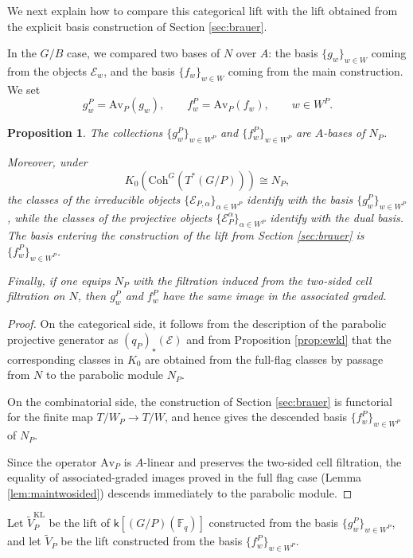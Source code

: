 \documentclass{amsart}
\newtheorem{prop}[thm]{Proposition}
\theoremstyle{definition}
\begin{document}
We next explain how to compare this categorical lift with the lift obtained from
the explicit basis construction of Section \ref{sec:brauer}.

In the $G/B$ case, we compared two bases of $N$ over $A$:
the basis $\{g_w\}_{w\in W}$ coming from the objects $\mathcal E_w$,
and the basis $\{f_w\}_{w\in W}$ coming from the main construction.
We set
\[
g_w^P = \mathrm{Av}_P(g_w), \qquad
f_w^P = \mathrm{Av}_P(f_w), \qquad w\in W^P.
\]

\begin{prop}\label{prop:parabolic-descent}
The collections $\{g_w^P\}_{w\in W^P}$ and $\{f_w^P\}_{w\in W^P}$
are $A$-bases of $N_P$.

Moreover, under
\[
K_0(\mathrm{Coh}^G(T^*(G/P)))\cong N_P,
\]
the classes of the irreducible objects
$\{\mathcal E_{P,\alpha}\}_{\alpha\in W^P}$ identify with the basis
$\{g_w^P\}_{w\in W^P}$, while the classes of the projective objects
$\{\mathcal E_P^{\alpha}\}_{\alpha\in W^P}$ identify with the dual basis. The basis entering the construction of the lift from
Section \ref{sec:brauer} is $\{f_w^P\}_{w\in W^P}$.

Finally, if one equips $N_P$ with the filtration induced from the two-sided
cell filtration on $N$, then $g_w^P$ and $f_w^P$ have the same image in the
associated graded.
\end{prop}

\begin{proof}
On the categorical side, it follows from the description of the parabolic projective
generator as $(q_P)_\star(\mathcal E)$ and from
Proposition \ref{prop:ewkl} that the corresponding classes in $K_0$ are obtained
from the full-flag classes by passage from $N$ to the parabolic module $N_P$.

On the combinatorial side, the construction of Section \ref{sec:brauer} is functorial for
the finite map $T/W_P\to T/W$, and hence gives the descended basis
$\{f_w^P\}_{w\in W^P}$ of $N_P$.

Since the operator $\mathrm{Av}_P$ is $A$-linear and preserves the two-sided cell
filtration, the equality of associated-graded images proved in the full flag case
(Lemma \ref{lem:maintwosided}) descends
immediately to the parabolic module.
\end{proof}

Let $\tilde V_P^{\mathrm{KL}}$ be the lift of $\mathsf{k}[(G/P)(\mathbb{F}_q)]$
constructed from the basis $\{g_w^P\}_{w\in W^P}$, and let $\tilde V_P$ be the
lift constructed from the basis $\{f_w^P\}_{w\in W^P}$.
\end{document}
